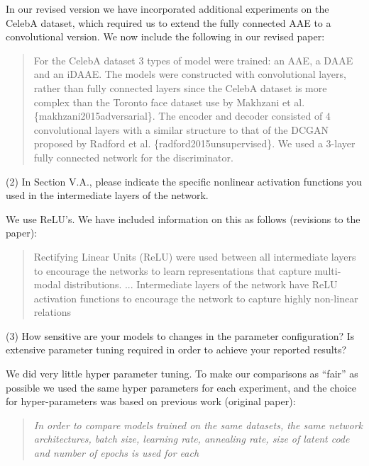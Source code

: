 \documentclass[a4paper,11pt]{article}
\begin{document}
In our revised version we have incorporated additional experiments on the CelebA dataset, which required us to extend the fully connected AAE to a convolutional version. We now include the following in our revised paper:

\begin{quote}
For the CelebA dataset $3$ types of model were trained: an AAE, a DAAE and an iDAAE. The models were constructed with convolutional layers, rather than fully connected layers since the CelebA dataset is more complex than the Toronto face dataset use by Makhzani et al. \{makhzani2015adversarial\}. The encoder and decoder consisted of $4$ convolutional layers with a similar structure to that of the DCGAN proposed by Radford et al. \{radford2015unsupervised\}. We used a $3$-layer fully connected network for the discriminator. 
\end{quote}

{\color{blue}
(2) In Section V.A., please indicate the specific nonlinear activation functions you used in the intermediate layers of the network.}\newline


We use ReLU's. We have included information on this as follows (revisions to the paper):
    \begin{quote}
        {\color{red} Rectifying Linear Units (ReLU) were used between all intermediate layers to encourage the networks to learn representations that capture multi-modal distributions.} \newline
        ... \newline
            {\color{red}Intermediate layers of the network have ReLU activation functions to encourage the network to capture highly non-linear relations}
    \end{quote}


{\color{blue}
(3) How sensitive are your models to changes in the parameter configuration? Is extensive parameter tuning required in order to achieve your reported results?}\newline


We did very little hyper parameter tuning. To make our comparisons as ``fair'' as possible we used the same hyper parameters for each experiment, and the choice for hyper-parameters was based on previous work (original paper):
    
    \begin{quote}
        {\it In  order  to  compare  models trained on the same datasets, the same network architectures, batch size, learning rate, annealing rate, size of latent code and number of epochs is used for each}
    \end{quote}
\end{document}
